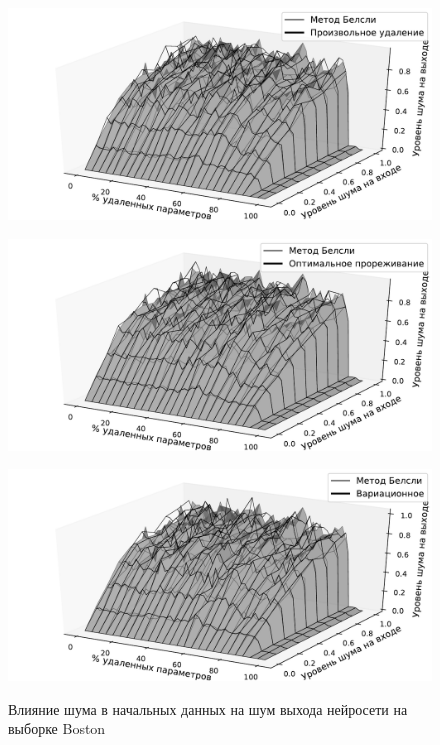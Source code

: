 \begin{figure}[h!t]\center
\begin{minipage}[t]{.45\textwidth}
{\includegraphics[width=\textwidth]{plots/grabovoy/Boston/RandomNoise3D.pdf}}
\end{minipage}
\begin{minipage}[t]{.45\textwidth}
{\includegraphics[width=\textwidth]{plots/grabovoy/Boston/OBDNoise3D.pdf}}
\end{minipage}

\begin{minipage}[t]{.45\textwidth}
{\includegraphics[width=\textwidth]{plots/grabovoy/Boston/VariationalNoise3D.pdf}}
\end{minipage}

\caption{Влияние шума в начальных данных на шум выхода нейросети на выборке Boston}
\label{BostonNoise}
\end{figure}


